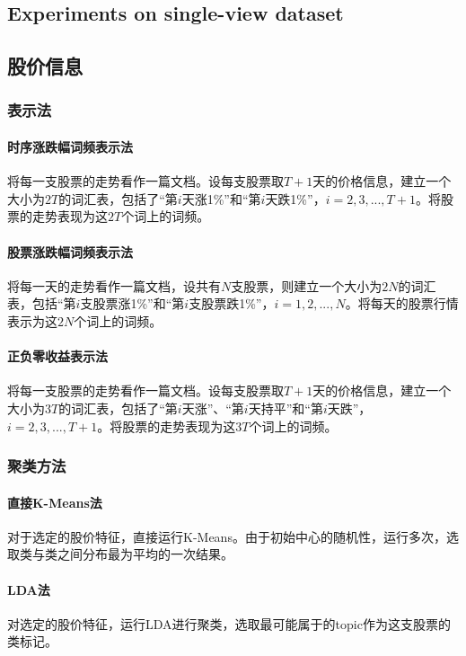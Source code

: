 \documentclass[12pt,a4paper]{article}
\begin{document}
\begin{CJK*}{UTF8}{song}
\section{Experiments on single-view dataset}
\subsection{股价信息}
\subsubsection{表示法}
\paragraph{时序涨跌幅词频表示法}
将每一支股票的走势看作一篇文档。设每支股票取$T+1$天的价格信息，建立一个大小为$2T$的词汇表，包括了“第$i$天涨1\%”和“第$i$天跌1\%”，$i=2,3,...,T+1$。将股票的走势表现为这$2T$个词上的词频。

\paragraph{股票涨跌幅词频表示法}
将每一天的走势看作一篇文档，设共有$N$支股票，则建立一个大小为$2N$的词汇表，包括“第$i$支股票涨1\%”和“第$i$支股票跌1\%”，$i=1,2,...,N$。将每天的股票行情表示为这$2N$个词上的词频。

\paragraph{正负零收益表示法}
将每一支股票的走势看作一篇文档。设每支股票取$T+1$天的价格信息，建立一个大小为$3T$的词汇表，包括了“第$i$天涨”、“第$i$天持平”和“第$i$天跌”，$i=2,3,...,T+1$。将股票的走势表现为这$3T$个词上的词频。

\subsubsection{聚类方法}
\label{SSSAggregationMethods}
\paragraph{直接K-Means法}
对于选定的股价特征，直接运行K-Means。由于初始中心的随机性，运行多次，选取类与类之间分布最为平均的一次结果。

\paragraph{LDA法}
对选定的股价特征，运行LDA进行聚类，选取最可能属于的topic作为这支股票的类标记。


\end{CJK*}
\end{document}
